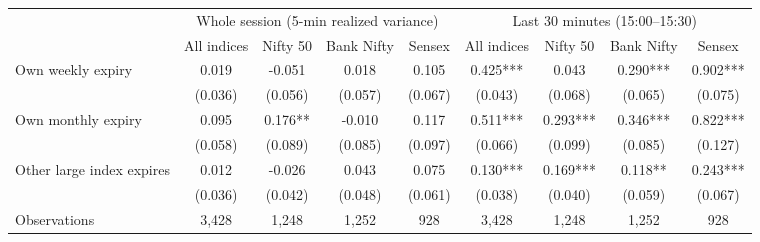 \begin{tabular}{lcccccccc}
\toprule
 & \multicolumn{4}{c}{Whole session (5-min realized variance)} & \multicolumn{4}{c}{Last 30 minutes (15:00--15:30)} \\
\cmidrule(lr){2-5}\cmidrule(lr){6-9}
 & All indices & Nifty 50 & Bank Nifty & Sensex & All indices & Nifty 50 & Bank Nifty & Sensex \\
\midrule
Own weekly expiry & 0.019 & -0.051 & 0.018 & 0.105 & 0.425*** & 0.043 & 0.290*** & 0.902*** \\
 & (0.036) & (0.056) & (0.057) & (0.067) & (0.043) & (0.068) & (0.065) & (0.075) \\
Own monthly expiry & 0.095 & 0.176** & -0.010 & 0.117 & 0.511*** & 0.293*** & 0.346*** & 0.822*** \\
 & (0.058) & (0.089) & (0.085) & (0.097) & (0.066) & (0.099) & (0.085) & (0.127) \\
Other large index expires & 0.012 & -0.026 & 0.043 & 0.075 & 0.130*** & 0.169*** & 0.118** & 0.243*** \\
 & (0.036) & (0.042) & (0.048) & (0.061) & (0.038) & (0.040) & (0.059) & (0.067) \\
\midrule
Observations & 3,428 & 1,248 & 1,252 & 928 & 3,428 & 1,248 & 1,252 & 928 \\
\bottomrule
\end{tabular}
